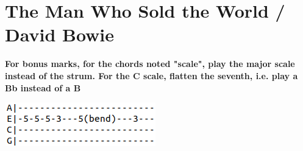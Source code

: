 \section{The Man Who Sold the World / David Bowie}\label{sec:themanwhosoldtheworld}
\textbf{For bonus marks, for the chords noted "scale", play the major scale instead of the strum. For the C scale, flatten the seventh, i.e. play a Bb instead of a B}

\includegraphics{songs/m/themanwhosoldtheworldtab.png}

\Amajor
\Dminor
\Fmajor
\Aseven
\Cmajor

